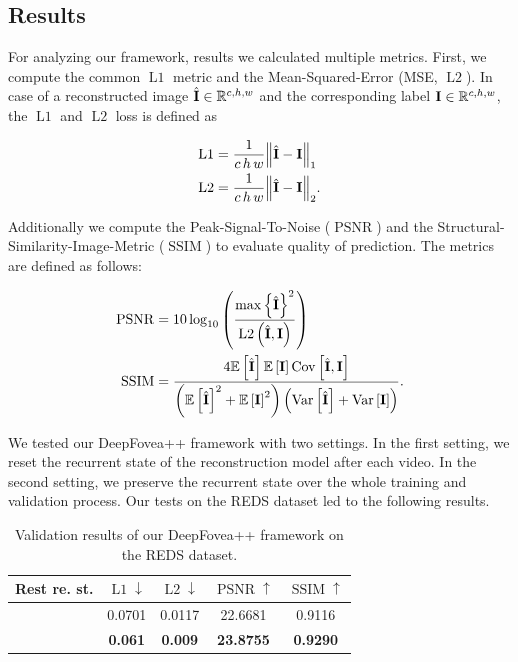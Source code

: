 \documentclass[10pt,twocolumn,letterpaper]{article}
\newcommand{\cmark}{\ding{51}}
\newcommand{\xmark}{\ding{55}}
\newcommand{\Tensor}[1]{\boldsymbol{\mathrm{\MakeUppercase{#1}}}}
\newcommand{\Set}[1]{\mathbb{#1}}
\newcommand{\Mean}[1]{\mathbb{E}\left[#1\right]}
\newcommand{\Var}[1]{\mathrm{Var}\left[#1\right]}
\newcommand{\Cov}[1]{\mathrm{Cov}\left[#1\right]}
\begin{document}
\subsection{Results} \label{subsec:results}
For analyzing our framework, results we calculated multiple metrics. First, we compute the common $\operatorname{L1}$ metric and the Mean-Squared-Error (MSE, $\operatorname{L2}$). In case of a reconstructed image $\hat{\Tensor{I}}\in\Set{R}^{c, h, w}$ and the corresponding label $\Tensor{I}\in\Set{R}^{c, h, w}$, the $\operatorname{L1}$ and $\operatorname{L2}$ loss is defined as

\begin{align}
    \operatorname{L1} &= \frac{1}{c\, h\, w}\norm{\hat{\Tensor{I}} - \Tensor{I}}_{1}\\
    \operatorname{L2} &= \frac{1}{c\, h\, w}\norm{\hat{\Tensor{I}} - \Tensor{I}}_{2}.
\end{align}

Additionally we compute the Peak-Signal-To-Noise ($\operatorname{PSNR}$) and the Structural-Similarity-Image-Metric ($\operatorname{SSIM}$) \cite{ssmi} to evaluate quality of prediction. The metrics are defined as follows:

\begin{align}
    \operatorname{PSNR}&=10 \log_{10}\left(\frac{\max\left\{\hat{\Tensor{I}}\right\}^2}{\operatorname{L2}\left(\hat{\Tensor{I}}, \Tensor{I}\right)} \right)\\
    \operatorname{SSIM}&=\frac{4\Mean{\hat{\Tensor{I}}}\Mean{\Tensor{I}}\Cov{\hat{\Tensor{I}}, \Tensor{I}}}{\left(\Mean{\hat{\Tensor{I}}}^2 + \Mean{\Tensor{I}}^2\right)\left(\Var{\hat{\Tensor{I}}} + \Var{\Tensor{I}}\right)}.
\end{align}

We tested our DeepFovea++ framework with two settings. In the first setting, we reset the recurrent state of the reconstruction model after each video. In the second setting, we preserve the recurrent state over the whole training and validation process. Our tests on the REDS dataset \cite{REDS} led to the following results.\\

\begin{table}[!htbp]
    \centering
    \begin{center}
        \begin{tabular}{c|c|c|c|c}
            Rest re. st. & $\operatorname{L1}\downarrow$ & $\operatorname{L2}\downarrow$ & $\operatorname{PSNR}\uparrow$ & $\operatorname{SSIM}\uparrow$ \\ 
            \hline 
            \cmark & 0.0701 & 0.0117 & 22.6681 & 0.9116 \\
            \xmark & {\bf 0.061} & {\bf 0.009} & {\bf 23.8755} & {\bf 0.9290} \\ 
            \hline 
        \end{tabular} 
    \end{center}
    \caption{Validation results of our DeepFovea++ framework on the REDS dataset.}
    \label{tab:results}
\end{table}
\end{document}
